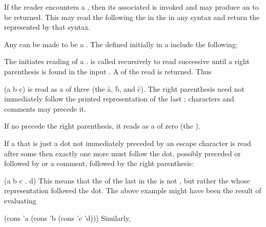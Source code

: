 
If the reader encounters a ,
then its associated  
is invoked and may produce an  to be returned.
This  may read the  
following the  in the  
in any syntax and return the  represented by that syntax.

Any  can be made to be a .
The  defined initially in a 
include
the following:



The  initiates reading of a .
 is called recursively to read successive 
until a right parenthesis is found in the input .
A  of the  read is returned.  Thus

\code
 (a b c)
\endcode
is read as a  of three 
(the  \f{a}, \f{b}, and \f{c}).
The right parenthesis need not immediately follow the printed representation of
the last ;                               
characters and comments may precede it.


If no  precede the right parenthesis, 
it reads as a  of zero  
(the ).

If a  that is just a dot
not immediately preceded by an escape character
is read after some 
then exactly one more  must follow the dot,
possibly preceded or followed by  or a comment,
followed by the right parenthesis:

\code
 (a b c . d)
\endcode
This means that the  of the last  in the 
 is not \nil,
but rather the  whose representation followed the dot.
The above example might have been the result of evaluating

\code
 (cons 'a (cons 'b (cons 'c 'd)))
\endcode
Similarly,

